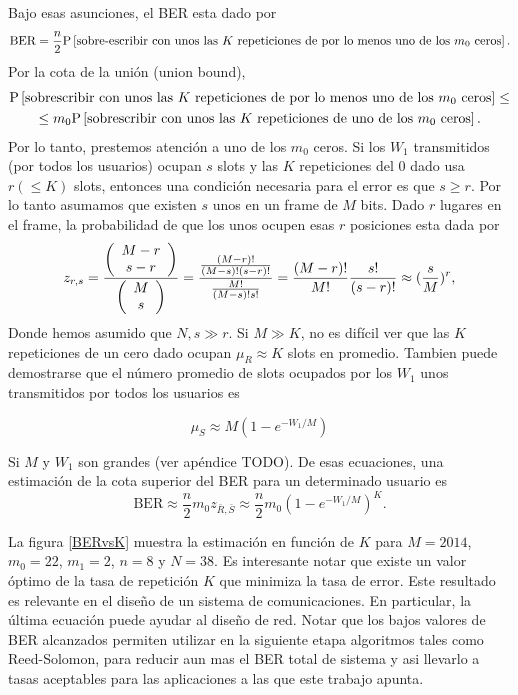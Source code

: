 Bajo esas asunciones, el BER esta dado por
\begin{equation}
\text{BER} = \frac{n}{2}\mathrm{P}\left[\text{sobre-escribir con unos las $K$ repeticiones de por lo menos uno de los $m_0$ ceros}\right].
\label{eq:ber_01}
\end{equation}
Por la cota de la unión (union bound), 
\begin{multline}
\mathrm{P}\left[\text{sobrescribir con unos las $K$ repeticiones de por lo menos uno de los $m_0$ ceros}\right]\leq \\
\leq m_0\mathrm{P}\left[\text{sobrescribir con unos las $K$ repeticiones de uno de los $m_0$ ceros}\right].
\label{eq:union_bound}
\end{multline}
Por lo tanto, prestemos atención a uno de los $m_0$ ceros. Si los $W_{1}$ transmitidos (por todos los usuarios) ocupan $s$ slots y las $K$ repeticiones del 0 dado usa $r ( \leq K)$ slots, entonces una condición necesaria para el error es que $s \geq r$. Por lo tanto asumamos que existen $s$ unos en un frame de $M$ bits. Dado $r$ lugares en el frame, la probabilidad de que los unos ocupen esas $r$ posiciones esta dada por 
\begin{equation}
z_{r,s} = \frac{\left(\begin{array}{c} M-r \\ s-r\end{array}\right)}{\left(\begin{array}{c} M \\ s\end{array}\right)}= \frac{\frac{(M-r)!}{(M-s)! (s-r)!}}{\frac{M!}{(M-s)!s!}} = \frac{(M-r)!}{M!}\frac{s!}{(s-r)!}\approx (\frac{s}{M})^r,
\end{equation}
Donde hemos asumido que $N,s\gg r$. Si $M \gg K$, no es difícil ver que las $K$ repeticiones de un cero dado ocupan $\mu_{R} \approx K$ slots en promedio. Tambien puede demostrarse que el número promedio de slots ocupados por los $W_{1}$ unos transmitidos por todos los usuarios es

\begin{equation}
\mu_{S} \approx M (1-e^{-W_1/M})
\end{equation}
 
Si $M$ y $W_{1}$ son grandes (ver apéndice TODO).
De esas ecuaciones, una estimación de la cota superior del BER para un determinado usuario es
\begin{equation}
\text{BER} \approx \frac{n}{2} m_0 z_{\bar{R},\bar{S}} \approx \frac{n}{2} m_0 \left(1-e^{-W_1/M}\right)^K.
\end{equation}

La figura \ref{BERvsK} muestra la estimación en función de $K$ para $M=2014$, $m_{0} = 22$, $m_{1} = 2$, $n = 8$ y $N=38$. Es interesante notar que existe un valor óptimo de la tasa de repetición $K$ que minimiza la tasa de error. Este resultado es relevante en el diseño de un sistema de comunicaciones. En particular, la última ecuación puede ayudar al diseño de red. Notar que los bajos valores de BER alcanzados permiten utilizar en la siguiente etapa algoritmos tales como Reed-Solomon, para reducir aun mas el BER total de sistema y asi llevarlo a tasas aceptables para las aplicaciones a las que este trabajo apunta.

